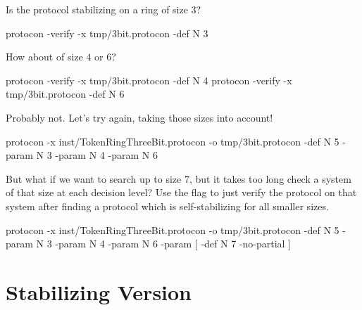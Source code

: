 Is the protocol stabilizing on a ring of size $3$?
\begin{code}
protocon -verify -x tmp/3bit.protocon -def N 3
\end{code}

How about of size $4$ or $6$?
\begin{code}
protocon -verify -x tmp/3bit.protocon -def N 4
protocon -verify -x tmp/3bit.protocon -def N 6
\end{code}

Probably not.
Let's try again, taking those sizes into account!
\begin{code}
protocon -x inst/TokenRingThreeBit.protocon -o tmp/3bit.protocon -def N 5 -param N 3 -param N 4 -param N 6
\end{code}

But what if we want to search up to size $7$, but it takes too long check a system of that size at each decision level?
Use the  flag to just verify the protocol on that system after finding a protocol which is self-stabilizing for all smaller sizes.
\begin{code}
protocon -x inst/TokenRingThreeBit.protocon -o tmp/3bit.protocon -def N 5 -param N 3 -param N 4 -param N 6 -param [ -def N 7 -no-partial ]
\end{code}

\section{Stabilizing Version}

